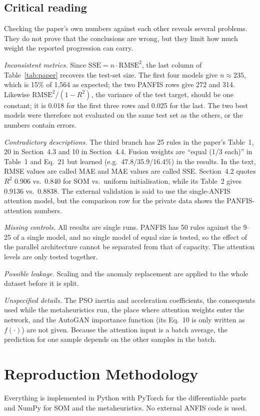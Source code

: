 \documentclass[conference]{IEEEtran}
\newcommand{\Rsq}{$R^2$}
\begin{document}
\subsection{Critical reading}
\label{sec:critical}
Checking the paper's own numbers against each other reveals several problems. They do not prove that the conclusions are wrong, but they limit how much weight the reported progression can carry.

\emph{Inconsistent metrics.} Since $\mathrm{SSE} = n\cdot\mathrm{RMSE}^2$, the last column of Table~\ref{tab:paper} recovers the test-set size. The first four models give $n\approx235$, which is 15\% of 1,564 as expected; the two PANFIS rows give 272 and 314. Likewise $\mathrm{RMSE}^2/(1-R^2)$, the variance of the test target, should be one constant; it is 0.018 for the first three rows and 0.025 for the last. The two best models were therefore not evaluated on the same test set as the others, or the numbers contain errors.

\emph{Contradictory descriptions.} The third branch has 25 rules in the paper's Table~1, 20 in Section~4.3 and 10 in Section~4.4. Fusion weights are ``equal (1/3 each)'' in Table~1 and Eq.~21 but learned (e.g.\ 47.8/35.9/16.4\%) in the results. In the text, RMSE values are called MAE and MAE values are called SSE. Section~4.2 quotes \Rsq{} 0.906 vs.\ 0.840 for SOM vs.\ uniform initialisation, while its Table~2 gives 0.9136 vs.\ 0.8838. The external validation is said to use the single-ANFIS attention model, but the comparison row for the private data shows the PANFIS-attention numbers.

\emph{Missing controls.} All results are single runs. PANFIS has 50 rules against the 9--25 of a single model, and no single model of equal size is tested, so the effect of the parallel architecture cannot be separated from that of capacity. The attention levels are only tested together.

\emph{Possible leakage.} Scaling and the anomaly replacement are applied to the whole dataset before it is split.

\emph{Unspecified details.} The PSO inertia and acceleration coefficients, the consequents used while the metaheuristics run, the place where attention weights enter the network, and the AutoGAN importance function (its Eq.~10 is only written as $f(\cdot)$) are not given. Because the attention input is a batch average, the prediction for one sample depends on the other samples in the batch.

\section{Reproduction Methodology}
\label{sec:repro}
Everything is implemented in Python with PyTorch for the differentiable parts and NumPy for SOM and the metaheuristics. No external ANFIS code is used.
\end{document}

